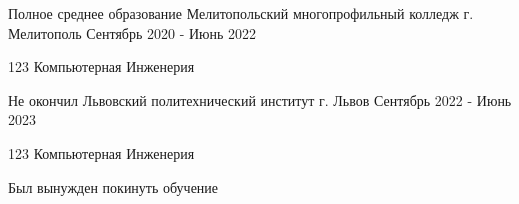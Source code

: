 

\begin{cventries}

  \cventry
    {Полное среднее образование} %
    {Мелитопольский многопрофильный колледж} %
    {г. Мелитополь} %
    {Сентябрь 2020 - Июнь 2022} %
    {
      \begin{cvitems} %
        \item {123 Компьютерная Инженерия}
      \end{cvitems}
    }
  \cventry
    {Не окончил}
    {Львовский политехнический институт}
    {г. Львов}
    {Сентябрь 2022 - Июнь 2023}
    {
      \begin{cvitems} %
        \item {123 Компьютерная Инженерия}
        \item {Был вынужден покинуть обучение}
      \end{cvitems}
    }

\end{cventries}
